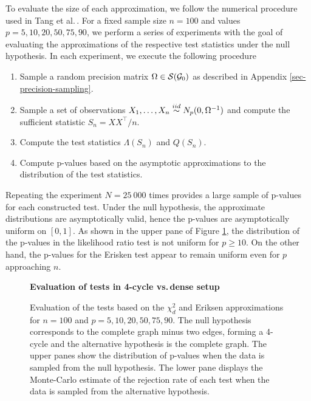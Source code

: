 To evaluate the size of each approximation, we follow the numerical procedure used in Tang et al.\,\cite{Tang2020}. For a fixed sample size $n = 100$ and values $p = 5, 10, 20, 50, 75, 90$, we perform a series of experiments with the goal of evaluating the approximations of the respective test statistics under the null hypothesis. In each experiment, we execute the following procedure
\begin{enumerate}
    \item Sample a random precision matrix $\Omega \in {\mathcal{S}}({\mathcal{G}}_0)$ as described in Appendix \ref{sec-precision-sampling}.
    \item Sample a set of observations $X_1, \ldots, X_n \stackrel{iid}{\sim} N_p(0, \Omega^{-1})$ and compute the sufficient statistic $S_n = X X^\top / n$.
    \item Compute the test statistics $\Lambda(S_n)$ and $Q(S_n)$.
    \item Compute p-values based on the asymptotic approximations to the distribution of the test statistics.
\end{enumerate}
Repeating the experiment $N = 25\ 000$ times provides a large sample of p-values for each constructed test. Under the null hypothesis, the approximate distributions are asymptotically valid, hence the p-values are asymptotically uniform on $[0, 1]$. As shown in the upper pane of Figure \ref{fig-complete-to-4cycle}, the distribution of the p-values in the likelihood ratio test is not uniform for $p \geq 10$. On the other hand, the p-values for the Erisken test appear to remain uniform even for $p$ approaching $n$.

\begin{figure}[!tbp]
    \textbf{Evaluation of tests in 4-cycle vs.\,dense setup}
    \centering
    \qquad
    \caption{Evaluation of the tests based on the $\chi^2_d$ and Eriksen approximations for $n = 100$ and $p = 5, 10, 20, 50, 75, 90$. The null hypothesis corresponds to the complete graph minus two edges, forming a 4-cycle and the alternative hypothesis is the complete graph. The upper panes show the distribution of p-values when the data is sampled from the null hypothesis. The lower pane displays the Monte-Carlo estimate of the rejection rate of each test when the data is sampled from the alternative hypothesis.}
    \label{fig-complete-to-4cycle}
\end{figure}


